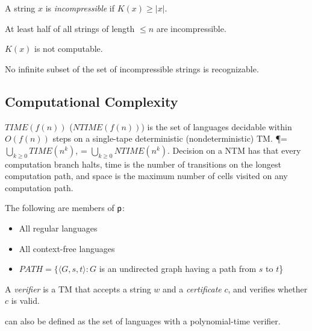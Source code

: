 \begin{definition}
A string $x$ is \emph{incompressible} if $K(x) \ge |x|$.
\end{definition}

\begin{theorem}
At least half of all strings of length $\le n$ are incompressible.
\end{theorem}

\begin{theorem}
$K(x)$ is not computable.
\end{theorem}

\begin{theorem}
No infinite subset of the set of incompressible strings is recognizable.
\end{theorem}

\subsection{Computational Complexity}

\begin{definition}
$TIME(f(n))$ ($NTIME(f(n))$) is the set of languages decidable within $O(f(n))$ steps on a single-tape deterministic (nondeterministic) TM. \P = $\bigcup_{k \ge 0}TIME(n^k)$, \NP = $\bigcup_{k \ge 0}NTIME(n^k)$. Decision on a NTM has that every computation branch halts, time is the number of transitions on the longest computation path, and space is the maximum number of cells visited on any computation path.
\end{definition}

\begin{theorem}
The following are members of ${\mathsf{p}}$:
\begin{itemize}
\item All regular languages
\item All context-free languages
\item $PATH = \{\langle G, s, t\rangle : G$ is an undirected graph having a path from $s$ to $t$\}
\end{itemize}
\end{theorem}

\begin{definition}
A \emph{verifier} is a TM that accepts a string $w$ and a \emph{certificate} $c$, and verifies whether $c$ is valid.
\end{definition}

\begin{theorem}
\NP can also be defined as the set of languages with a polynomial-time verifier.
\end{theorem}

